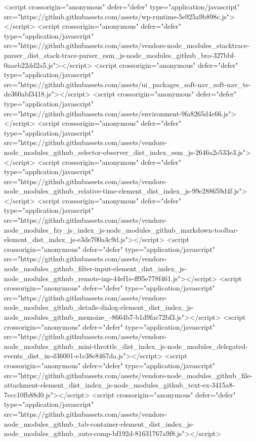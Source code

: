   <script crossorigin="anonymous" defer="defer" type="application/javascript" src="https://github.githubassets.com/assets/wp-runtime-5e925a9b898c.js"></script>
<script crossorigin="anonymous" defer="defer" type="application/javascript" src="https://github.githubassets.com/assets/vendors-node_modules_stacktrace-parser_dist_stack-trace-parser_esm_js-node_modules_github_bro-327bbf-0aaeb22dd2a5.js"></script>
<script crossorigin="anonymous" defer="defer" type="application/javascript" src="https://github.githubassets.com/assets/ui_packages_soft-nav_soft-nav_ts-de360abf3418.js"></script>
<script crossorigin="anonymous" defer="defer" type="application/javascript" src="https://github.githubassets.com/assets/environment-9fa8265d4c66.js"></script>
<script crossorigin="anonymous" defer="defer" type="application/javascript" src="https://github.githubassets.com/assets/vendors-node_modules_github_selector-observer_dist_index_esm_js-2646a2c533e3.js"></script>
<script crossorigin="anonymous" defer="defer" type="application/javascript" src="https://github.githubassets.com/assets/vendors-node_modules_github_relative-time-element_dist_index_js-99e288659d4f.js"></script>
<script crossorigin="anonymous" defer="defer" type="application/javascript" src="https://github.githubassets.com/assets/vendors-node_modules_fzy_js_index_js-node_modules_github_markdown-toolbar-element_dist_index_js-e3de700a4c9d.js"></script>
<script crossorigin="anonymous" defer="defer" type="application/javascript" src="https://github.githubassets.com/assets/vendors-node_modules_github_filter-input-element_dist_index_js-node_modules_github_remote-inp-44ef1e-ff95e778f461.js"></script>
<script crossorigin="anonymous" defer="defer" type="application/javascript" src="https://github.githubassets.com/assets/vendors-node_modules_github_details-dialog-element_dist_index_js-node_modules_github_memoize_-8664b7-b1d9fac72bf3.js"></script>
<script crossorigin="anonymous" defer="defer" type="application/javascript" src="https://github.githubassets.com/assets/vendors-node_modules_github_mini-throttle_dist_index_js-node_modules_delegated-events_dist_in-d36001-e1c38c8467da.js"></script>
<script crossorigin="anonymous" defer="defer" type="application/javascript" src="https://github.githubassets.com/assets/vendors-node_modules_github_file-attachment-element_dist_index_js-node_modules_github_text-ex-3415a8-7ecc10fb88d0.js"></script>
<script crossorigin="anonymous" defer="defer" type="application/javascript" src="https://github.githubassets.com/assets/vendors-node_modules_github_tab-container-element_dist_index_js-node_modules_github_auto-comp-bf192d-81631767a9f8.js"></script>

